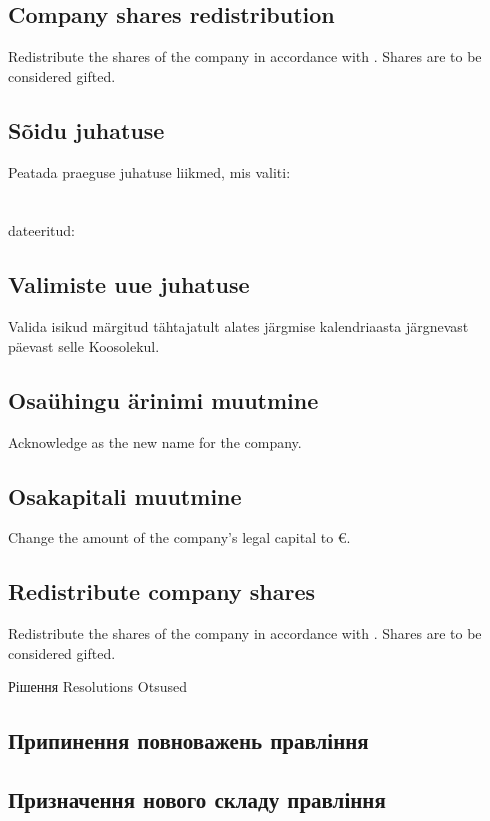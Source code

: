 \begin{Form}
\begin{paracol}{3}
{          \subsection{Company shares redistribution}
          Redistribute the shares of the company in accordance with . Shares are to be considered gifted.
        }
        { \subsection{Sõidu juhatuse}
          Peatada praeguse juhatuse liikmed, mis valiti:\\
          \\
          \\
          dateeritud:\\
          \subsection{Valimiste uue juhatuse}
          Valida isikud märgitud  tähtajatult alates järgmise kalendriaasta järgnevast päevast selle Koosolekul.
          \subsection{Osaühingu ärinimi muutmine}
          Acknowledge  as the new name for the company.
          \subsection{Osakapitali muutmine}
          Change the amount of the company's legal capital to  €.
          \subsection{Redistribute company shares}
          Redistribute the shares of the company in accordance with . Shares are to be considered gifted.
        }
      \multibreak
      \clause
        {Рішення}
        {Resolutions}
        {Otsused}
        { \subsection{Припинення повноважень правління}
          \subsection{Призначення нового складу правління}
}
\end{paracol}
\end{Form}
